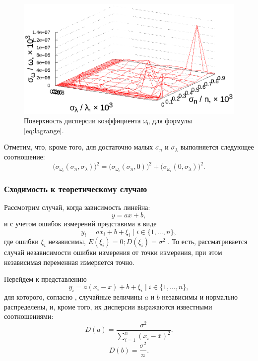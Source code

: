 \documentclass[12pt,a4paper]{article}
\begin{document}
\begin{figure}[h]
  \centering
  \includegraphics[scale=1.2]{figs/lagrange/p1.txt_coeff0.dat.eps}
  \caption{Поверхность дисперсии коэффициента $\omega_0$ для формулы \eqref{eq:lagrange}.}
  \label{fig:lagrange_i_0}
\end{figure}

Отметим, что, кроме того, для достаточно малых $\sigma_n$ и $\sigma_\lambda$ выполняется
следующее соотношение:
\[
  \big(\sigma_{\omega_i}(\sigma_n, \sigma_{\lambda})\big)^2 =
  	\big(\sigma_{\omega_i}(\sigma_n, 0)\big)^2 +
  	  \big(\sigma_{\omega_i}(0, \sigma_{\lambda})\big)^2.
\]

\subsubsection{Сходимость к теоретическому случаю}

Рассмотрим случай, когда зависимость линейна:
\[
  y = ax + b,
\]
и с учетом ошибок измерений представима в виде
\[
  y_i = ax_i + b + \xi_i \mid i \in \{ 1, \dots, n \},
\]
где ошибки $\xi_i$ независимы, $E(\xi_i) = 0; D(\xi_i) = \sigma^2$ \cite{Vatunin05}.
То есть, рассматривается случай независимости ошибки измерения от точки измерения,
при этом независимая переменная измеряется точно.

Перейдем к представлению
\[
  y_i = a(x_i - \overline{x}) + b + \xi_i \mid i \in \{ 1, \dots, n \},
\]
для которого, согласно \cite{Vatunin05}, случайные величины $a$ и $b$ независимы
и нормально распределены, и, кроме того, их дисперсии выражаются известными соотношениями:
\begin{equation}
  \label{eq:classic_da}
  D(a) = \frac{\sigma^2}{\sum_{i = 1}^n (x_i - \overline{x})^2}.
\end{equation}
\begin{equation}
  \label{eq:classic_db}
  D(b) = \frac{\sigma^2}{n}.
\end{equation}
\end{document}
